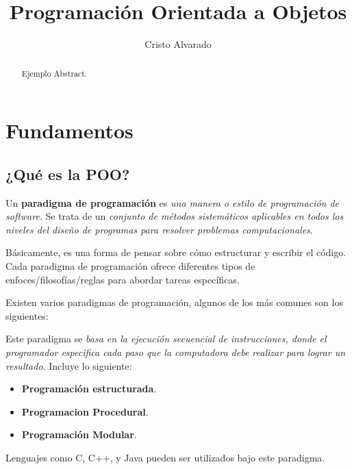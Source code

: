 \documentclass[12pt]{article}
\theoremstyle{largebreak}
\begin{document}
    \setlength{\parskip}{5pt}
    \setlength{\parindent}{12pt}
    \title{Programación Orientada a Objetos}
    \author{Cristo Alvarado}
    \maketitle

    \begin{abstract}
        Ejemplo Abstract.
    \end{abstract}
    
    \tableofcontents

    \lstlistoflistings

    \section{Fundamentos}

    \subsection{¿Qué es la POO?}

    \begin{mydef}
        Un \textbf{paradigma de programación} es \textit{una manera o estilo de programación de software}. Se trata de un \textit{conjunto de métodos sistemáticos aplicables en todos los niveles del diseño de programas para resolver problemas computacionales}.
    \end{mydef}

    Básicamente, es una forma de pensar sobre cómo estructurar y escribir el código. Cada paradigma de programación ofrece diferentes tipos de enfoces/filosofías/reglas para abordar tareas específicas.

    Existen varios paradigmas de programación, algunos de los más comunes son los siguientes:

    \begin{exa}
        Este paradigma se \textit{basa en la ejecución secuencial de instrucciones, donde el programador especifica cada paso que la computadora debe realizar para lograr un resultado}. Incluye lo siguiente: 
        \begin{itemize}
            \item \textbf{Programación estructurada}.
            \item \textbf{Programacion Procedural}.
            \item \textbf{Programación Modular}.
        \end{itemize}
        Lenguajes como C, C++, y Java pueden ser utilizados bajo este paradigma.
    \end{exa}
\end{document}
